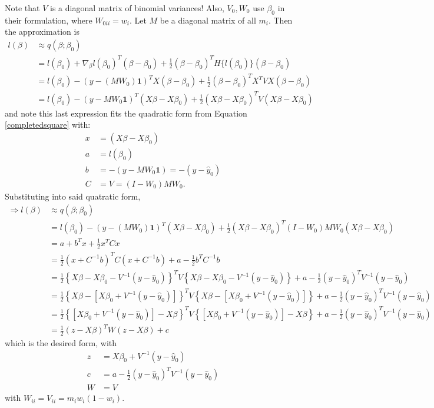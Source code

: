 \documentclass{article}
\begin{document}
\begin{enumerate}[(A)]
Note that $V$ is a diagonal matrix of binomial variances! Also, $V_0,W_0$ use $\beta_0$ in their formulation, where $W_{0ii} = w_i$. Let $M$ be a diagonal matrix of all $m_i$.  Then the approximation is
\begin{align*}
l(\beta) &\approx q(\beta; \beta_0) \\
&= l(\beta_0) + \nabla_\beta l(\beta_0)^T (\beta-\beta_0) + \frac{1}{2} (\beta-\beta_0)^T H\{l(\beta_0)\} (\beta-\beta_0)\\
&= l(\beta_0) - (y-(MW_0)\bm{1})^T X(\beta-\beta_0) + \frac{1}{2} (\beta-\beta_0)^T X^TVX (\beta-\beta_0)\\
&=  l(\beta_0)  - (y-MW_0\bm{1})^T (X\beta-X\beta_0) + \frac{1}{2} (X\beta-X\beta_0) ^TV (X\beta-X\beta_0)
\end{align*}
and note this last expression fits the quadratic form from Equation \ref{completedsquare} with:
\begin{align*}
x &=  (X\beta-X\beta_0) \\
a &=   l(\beta_0) \\
b &= -(y-MW_0\bm{1}) = -(y - \hat{y}_0)\\
C &= V= (I - W_0) M W_0. 
\end{align*}
Substituting into said quatratic form, 
\begin{align*}
\Rightarrow l(\beta) &\approx  q(\beta; \beta_0)\\
&=  l(\beta_0)  - (y-(MW_0)\bm{1})^T (X\beta-X\beta_0) + \frac{1}{2} (X\beta-X\beta_0) ^T(I - W_0) M W_0 (X\beta-X\beta_0)\\
&= a + b^Tx + \frac{1}{2} x^T Cx \\
&= \frac{1}{2}(x+C^{-1}b)^T C (x+C^{-1}b) + a - \frac{1}{2}b^TC^{-1}b\\
&=  \frac{1}{2}\left\{ X\beta-X\beta_0-V^{-1}(y- \hat{y}_0)\right\}^TV \left\{ X\beta-X\beta_0-V^{-1}(y- \hat{y}_0)\right\} + a - \frac{1}{2}(y- \hat{y}_0)^TV^{-1}(y- \hat{y}_0)\\
&=  \frac{1}{2}\left\{ X\beta-\left[X\beta_0+V^{-1}(y- \hat{y}_0)\right]\right\}^TV \left\{ X\beta-\left[X\beta_0 + V^{-1}(y- \hat{y}_0)\right]\right\} + a - \frac{1}{2}(y- \hat{y}_0)^TV^{-1}(y- \hat{y}_0)\\
&=  \frac{1}{2} \left\{ \left[ X\beta_0+V^{-1}(y- \hat{y}_0)\right] - X\beta \right\}^TV \left\{ \left[ X\beta_0+V^{-1}(y- \hat{y}_0)\right] - X\beta \right\} + a - \frac{1}{2}(y- \hat{y}_0)^TV^{-1}(y- \hat{y}_0 )\\
& = \frac{1}{2}(z - X \beta)^T W (z - X \beta) + c
\end{align*}
which is the desired form, with
\begin{align*}
z &=  X\beta_0+V^{-1}(y- \hat{y}_0) \\
c &=a - \frac{1}{2}(y- \hat{y}_0)^TV^{-1}(y- \hat{y}_0 )\\
W &= V 
\end{align*}
with $W_{ii} = V_{ii} = m_iw_i(1 - w_i)$.
\color{black}





\end{enumerate}
\end{document}
